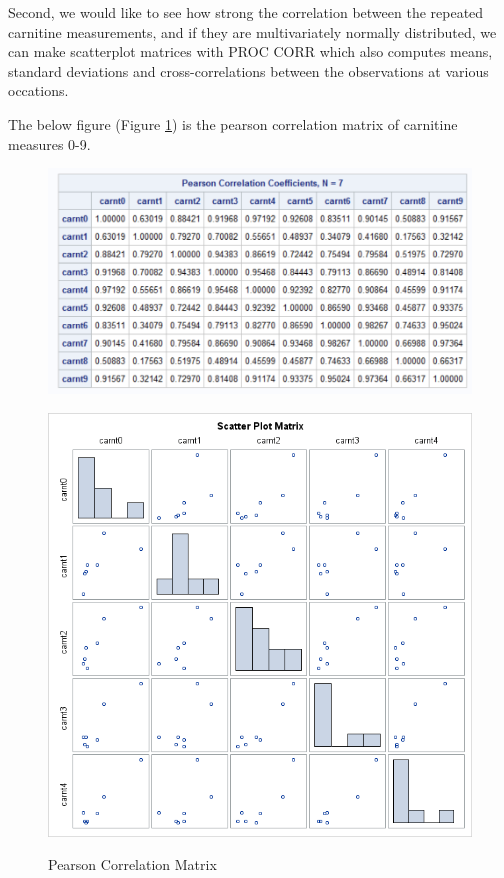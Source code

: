 \begin{itemize}
Second, we would like to see how strong the correlation between the repeated carnitine measurements, and if they are multivariately normally distributed, we can make scatterplot matrices with PROC CORR which also computes means, standard deviations and cross-correlations between the observations at various occations.

The below figure (Figure \ref{fig:desc2}) is the pearson correlation matrix of carnitine measures 0-9. 
\begin{figure}[h]
\centering
\begin{minipage}{.5\textwidth}
  \centering
  \includegraphics[width=1\linewidth]{HW4/img/desc2.png}
  \label{fig:test1}
\end{minipage}%
\begin{minipage}{.5\textwidth}
  \centering
  \includegraphics[width=1\linewidth]{HW4/img/desc3.png}
  \label{fig:test2}
\end{minipage}
   \caption{Pearson Correlation Matrix}
\label{fig:desc2}
\end{figure}


\end{itemize}
